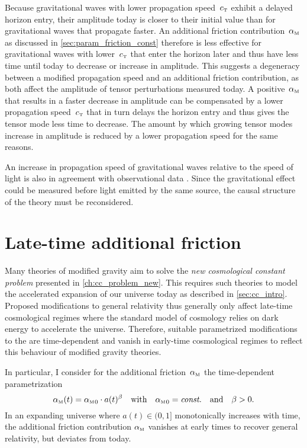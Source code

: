 \documentclass[12pt,parskip=half]{scrreprt}
\begin{document}
Because gravitational waves with lower propagation speed~\({c_{\textnormal{\tiny{T}}}}\) exhibit a delayed horizon entry, their amplitude today is closer to their initial value than for gravitational waves that propagate faster. An additional friction contribution~\({\alpha_{\textnormal{\tiny{M}}}}\) as discussed in \autoref{sec:param_friction_const} therefore is less effective for gravitational waves with lower~\({c_{\textnormal{\tiny{T}}}}\) that enter the horizon later and thus have less time until today to decrease or increase in amplitude. This suggests a degeneracy between a modified propagation speed and an additional friction contribution, as both affect the amplitude of tensor perturbations measured today. A positive~\({\alpha_{\textnormal{\tiny{M}}}}\) that results in a faster decrease in amplitude can be compensated by a lower propagation speed~\({c_{\textnormal{\tiny{T}}}}\) that in turn delays the horizon entry and thus gives the tensor mode less time to decrease. The amount by which growing tensor modes increase in amplitude is reduced by a lower propagation speed for the same reasons.

An increase in propagation speed of gravitational waves relative to the speed of light is also in agreement with observational data \autocite{Raveri2014}. Since the gravitational effect could be measured before light emitted by the same source, the causal structure of the theory must be reconsidered. 


\section{Late-time additional friction}\label{sec:param_friction_late}

Many theories of modified gravity aim to solve the \emph{new cosmological constant problem} presented in \autoref{ch:cc_problem_new}. This requires such theories to model the accelerated expansion of our universe today as described in \autoref{sec:cc_intro}. Proposed modifications to general relativity thus generally only affect late-time cosmological regimes  where the \LCDM standard model of cosmology relies on dark energy to accelerate the universe. Therefore, suitable parametrized modifications to the  are time-dependent and vanish in early-time cosmological regimes to reflect this behaviour of modified gravity theories.

In particular, I consider for the additional friction~\({\alpha_{\textnormal{\tiny{M}}}}\) the time-dependent pa\-ra\-me\-tri\-za\-tion
\begin{equation}\label{eq:friction_param_powerlaw}
	{\alpha_{\textnormal{\tiny{M}}}}(t) = {\alpha_{\textnormal{\tiny{M}}}}_0 \cdot a(t)^\beta \quad \text{with} \quad {\alpha_{\textnormal{\tiny{M}}}}_0 = \textnormal{\textit{const.}} \quad \text{and} \quad \beta > 0
	\mathpunct{.}
\end{equation}
In an expanding universe where \(a(t) \in (0,1]\) monotonically increases with time, the additional friction contribution \({\alpha_{\textnormal{\tiny{M}}}}\) vanishes at early times to recover general relativity, but deviates from \LCDM today.
\end{document}
